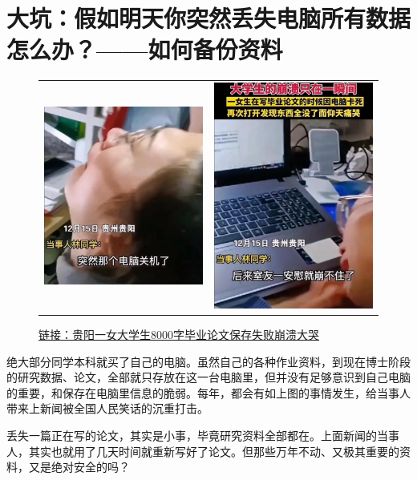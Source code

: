 \section{大坑：假如明天你突然丢失电脑所有数据怎么办？——如何备份资料}

\begin{figure}[H]
    \begin{tabular}{rl}
        \includegraphics[width=0.5\columnwidth]{author-folder/Kai.Wu/backup1.jpg} &
        \includegraphics[width=0.4\columnwidth]{author-folder/Kai.Wu/backup2.jpg}
    \end{tabular}
    \caption{\href{https://baijiahao.baidu.com/s?id=1719578217211021768}{链接：贵阳一女大学生8000字毕业论文保存失败崩溃大哭}}
\end{figure}

绝大部分同学本科就买了自己的电脑。虽然自己的各种作业资料，到现在博士阶段的研究数据、论文，全部就只存放在这一台电脑里，但并没有足够意识到自己电脑的重要，和保存在电脑里信息的脆弱。每年，都会有如上图的事情发生，给当事人带来上新闻被全国人民笑话的沉重打击。

丢失一篇正在写的论文，其实是小事，毕竟研究资料全部都在。上面新闻的当事人，其实也就用了几天时间就重新写好了论文。但那些万年不动、又极其重要的资料，又是绝对安全的吗？

